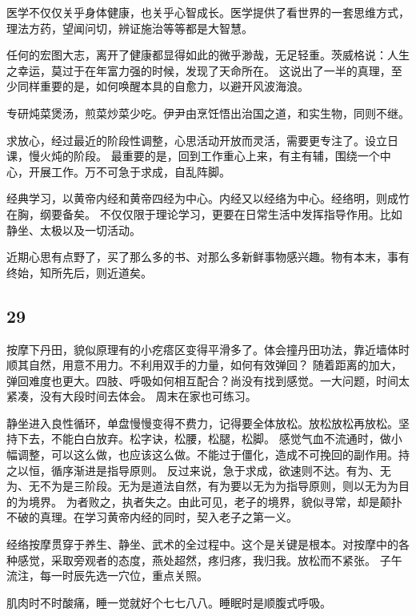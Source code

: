 医学不仅仅关乎身体健康，也关乎心智成长。医学提供了看世界的一套思维方式，理法方药，望闻问切，辨证施治等等都是大智慧。

任何的宏图大志，离开了健康都显得如此的微乎渺哉，无足轻重。茨威格说：人生之幸运，莫过于在年富力强的时候，发现了天命所在。
这说出了一半的真理，至少同样重要的是，如何唤醒本具的自愈力，以避开风波海浪。

专研炖菜煲汤，煎菜炒菜少吃。伊尹由烹饪悟出治国之道，和实生物，同则不继。

求放心，经过最近的阶段性调整，心思活动开放而灵活，需要更专注了。设立日课，慢火炖的阶段。
最重要的是，回到工作重心上来，有主有辅，围绕一个中心，开展工作。万不可急于求成，自乱阵脚。

经典学习，以黄帝内经和黄帝四经为中心。内经又以经络为中心。经络明，则成竹在胸，纲要备矣。
不仅仅限于理论学习，更要在日常生活中发挥指导作用。比如静坐、太极以及一切活动。

近期心思有点野了，买了那么多的书、对那么多新鲜事物感兴趣。物有本末，事有终始，知所先后，则近道矣。

\subsection{29}

按摩下丹田，貌似原理有的小疙瘩区变得平滑多了。体会撞丹田功法，靠近墙体时顺其自然，用意不用力。不利用双手的力量，如何有效弹回？
随着距离的加大，弹回难度也更大。四肢、呼吸如何相互配合？尚没有找到感觉。一大问题，时间太紧凑，没有大段时间去体会。
周末在家也可练习。

静坐进入良性循环，单盘慢慢变得不费力，记得要全体放松。放松放松再放松。坚持下去，不能白白放弃。松字诀，松腰，松腿，松脚。
感觉气血不流通时，做小幅调整，可以这么做，也应该这么做。不能过于僵化，造成不可挽回的副作用。持之以恒，循序渐进是指导原则。
反过来说，急于求成，欲速则不达。有为、无为、无不为是三阶段。无为是道法自然，有为要以无为为指导原则，则以无为为目的为境界。
为者败之，执者失之。由此可见，老子的境界，貌似寻常，却是颠扑不破的真理。在学习黄帝内经的同时，契入老子之第一义。

经络按摩贯穿于养生、静坐、武术的全过程中。这个是关键是根本。对按摩中的各种感觉，采取旁观者的态度，燕处超然，疼归疼，我归我。放松而不紧张。
子午流注，每一时辰先选一穴位，重点关照。

肌肉时不时酸痛，睡一觉就好个七七八八。睡眠时是顺腹式呼吸。
